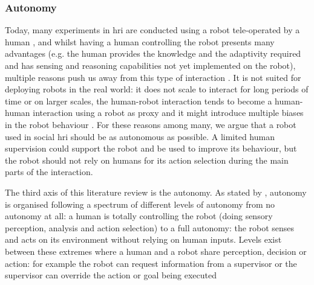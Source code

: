 \subsubsection{Autonomy}
	
	Today, many experiments in \gls{hri} are conducted using a robot tele-operated by a human \citep{riek2012wizard,baxter2016characterising}, and whilst having a human controlling the robot presents many advantages (e.g. the human provides the knowledge and the adaptivity required and has sensing and reasoning capabilities not yet implemented on the robot), multiple reasons push us away from this type of interaction \citep{Thill2013}. It is not suited for deploying robots in the real world: it does not scale to interact for long periods of time or on larger scales, the human-robot interaction tends to become a human-human interaction using a robot as proxy \citep{baxter2016characterising} and it might introduce multiple biases in the robot behaviour \citep{howley2014effects}. For these reasons among many, we argue that a robot used in social \gls{hri} should be as autonomous as possible. A limited human supervision could support the robot and be used to improve its behaviour, but the robot should not rely on humans for its action selection during the main parts of the interaction. 
		
    The third axis of this literature review is the autonomy. As stated by \citet{beer2014toward}, autonomy is organised following a spectrum of different levels of autonomy from no autonomy at all: a human is totally controlling the robot (doing sensory perception, analysis and action selection) to a full autonomy: the robot senses and acts on its environment without relying on human inputs. Levels exist between these extremes where a human and a robot share perception, decision or action: for example the robot can request information from a supervisor or the supervisor can override the action or goal being executed
    

